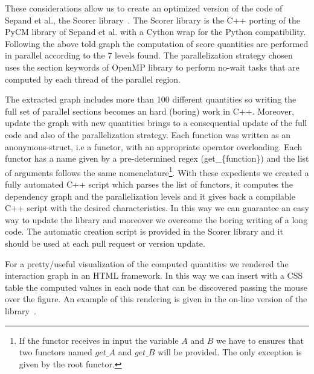 \documentclass{standalone}
\begin{document}
These considerations allow us to create an optimized version of the code of Sepand et al., the \textsf{Scorer} library~\cite{Scorer}.
The \textsf{Scorer} library is the \textsf{C++} porting of the \textsf{PyCM} library of Sepand et al. with a \textsf{Cython} wrap for the \textsf{Python} compatibility.
Following the above told graph the computation of score quantities are performed in parallel according to the 7 levels found.
The parallelization strategy chosen uses the \textsf{section} keywords of OpenMP library to perform no-wait tasks that are computed by each thread of the parallel region.

The extracted graph includes more than 100 different quantities so writing the full set of parallel sections becomes an hard (boring) work in \textsf{C++}.
Moreover, update the graph with new quantities brings to a consequential update of the full code and also of the parallelization strategy.
Each function was written as an anonymous-struct, i.e a functor, with an appropriate operator overloading.
Each functor has a name given by a pre-determined regex (\textsf{get\_\{function\}}) and the list of arguments follows the same nomenclature\footnote{
  If the functor receives in input the variable $A$ and $B$ we have to ensures that two functors named $get\_A$ and $get\_B$ will be provided.
  The only exception is given by the root functor.
}.
With these expedients we created a fully automated \textsf{C++} script which parses the list of functors, it computes the dependency graph and the parallelization levels and it gives back a compilable \textsf{C++} script with the desired characteristics.
In this way we can guarantee an easy way to update the library and moreover we overcome the boring writing of a long code.
The automatic creation script is provided in the \textsf{Scorer} library and it should be used at each pull request or version update.

For a pretty/useful visualization of the computed quantities we rendered the interaction graph in an HTML framework.
In this way we can insert with a CSS table the computed values in each node that can be discovered passing the mouse over the figure.
An example of this rendering is given in the on-line version of the library~\cite{Scorer}.
\end{document}
